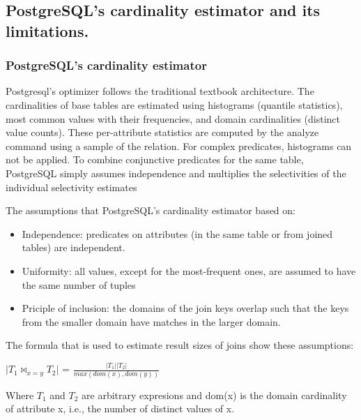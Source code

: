 \subsection{PostgreSQL's cardinality estimator and its limitations.}
\subsubsection{PostgreSQL's cardinality estimator}
{\justify
Postgresql's optimizer follows the traditional textbook architecture. The cardinalities of base tables are estimated using histograms (quantile statistics), most common values with their frequencies, and domain cardinalities (distinct value counts). These per-attribute statistics are computed by the analyze command using a sample of the relation. For complex predicates, histograms can not be applied. To combine conjunctive predicates for the same table, PostgreSQL simply assumes independence and multiplies the selectivities of the individual selectivity estimates 
\par }
\vspace{0.5cm}
{\justify
The assumptions that PostgreSQL's cardinality estimator based on:
\begin{itemize}
\item Independence: predicates on attributes (in the same table or from joined tables) are independent.
\item Uniformity: all values, except for the most-frequent ones, are assumed to have the same number of tuples
\item Priciple of inclusion: the domains of the join keys overlap such that the keys from the smaller domain have matches in the larger domain.
\end{itemize}
The formula \cite{JOB} that is used to estimate result sizes of joins show these assumptions:\\
{\justify
\centering $\vert T_{1} \bowtie_{x=y} T_{2}\vert$ = $\frac{{\vert {T_{1}\vert}}{\vert {T_{2}\vert}}}{max(dom(x),dom(y))}$ 
\par }
\vspace{0.5cm}
Where $T_{1}$ and $T_{2}$ are arbitrary expresions and dom(x) is the domain cardinality of attribute x, i.e., the number of distinct values of x.
\par }
\vspace{0.5cm}
